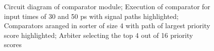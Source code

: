 \documentclass[conference]{IEEEtran}
\begin{document}
    \begin{figure}

\caption[]{
   Circuit diagram of comparator module;
 Execution of comparator for input times of 30 and 50 ps with signal paths highlighted;
 Comparators aranged in sorter of size 4 with path of largest priority score highlighted;
 Arbiter selecting the top 4 out of 16 priority scores}%
    \end{figure}
\end{document}
